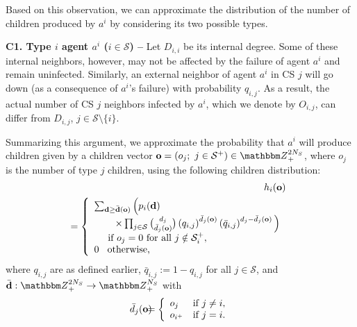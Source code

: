 \documentclass[10pt, journal, compsoc]{IEEEtran}
\newcommand {\cS}{{\mathcal{S}}}
\newcommand {\bd} {{\bf d}}
\newcommand {\bo} {{\bf o}}
\newcommand {\Z} {{\mathbbm Z}}
\newcommand {\R} {{\rm I\kern-2.5pt R}}
\newcommand{\beqa}{\begin{eqnarray}}
\newcommand{\eeqa}{\end{eqnarray}}
\newcommand{\myeq}{& \hspace{-0.1in} = & \hspace{-0.1in}}
\newcommand{\lb}{\nonumber \\}
\newcommand{\myhb}{\hspace{-0.3in}}
\newcommand{\myhf}{\hspace{0.3in}}
\newcommand{\myskip}{\\ \vspace{-0.1in}}
\begin{document}
Based on this observation, we can approximate 
the distribution of the number of children 
produced by $a^i$ by considering its two possible
types.

{\bf C1. Type $i$ agent $a^i$ ($i \in \cS$) --}
Let $D_{i,i}$ be its internal 
degree. Some of these internal neighbors, 
however, may not be affected by the failure
of agent $a^i$ and remain uninfected. 
Similarly, an external 
neighbor of agent $a^i$ in CS $j$ will 
go down (as a consequence of 
$a^i$'s failure) with probability $q_{i,j}$. 
As a result, the actual number of CS $j$ neighbors
infected by $a^i$, which we 
denote by $O_{i,j}$, can differ from $D_{i,j}$, 
$j \in \cS \setminus \{i\}$. 




Summarizing this argument, 
we approximate 
%
the probability that $a^i$ 
will produce children given by a children
vector ${\bf o} = (o_j; \ j \in \cS^+) \in 
\Z_+^{2 N_S}$, where $o_j$ is the number of 
type $j$ children, using the following 
children distribution:
\beqa
&& \myhb h_i({\bf o}) 
	\label{eq:hi1} \\
\myeq \left\{ \begin{array}{l}
	\sum_{{\bf d} \geq \bar{\bd}({\bf o})} 
	\Big( p_{i}(\bd) \\
	\myhf \times \prod_{j \in \cS} 
		{{d_j}\choose{\bar{d}_j(\bo)}} 
			\left( q_{i,j} \right)^{\bar{d}_j(\bo)}
			\left( \bar{q}_{i,j} \right)^{d_j 
				- \bar{d}_j(\bo)} \Big) \lb
	\hspace{0.15in} \mbox{ if } o_j = 0
	\mbox{ for all } j \notin \cS^+_i, \\
	0 \hspace{0.12in} \mbox{otherwise,}
	\end{array} \right.
	\nonumber
\eeqa
where $q_{i,j}$ are as defined earlier,
$\bar{q}_{i,j} := 1 - q_{i,j}$ for all $j 
\in \cS$, and $\bar{\bd} : \Z_+^{2 N_S} \to 
\Z_+^{N_S}$ with 
\beqa
\bar{d}_j({\bf o})
\myeq \left\{ \begin{array}{ll}
	o_j & \mbox{if } j \neq i, \\
	o_{i^+} & \mbox{if } j = i.
	\end{array} \right.  
	\label{eq:bard}
\eeqa
\end{document}
